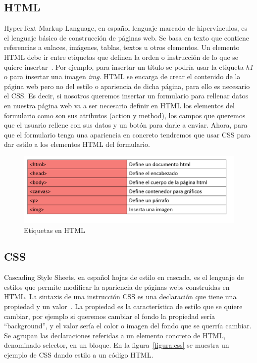 \documentclass[a4paper, 12pt]{book}
\begin{document}
\subsection{HTML}
HyperText Markup Language, en español lenguaje marcado de hipervínculos, es el lenguaje básico de construcción de páginas web. Se basa en texto que contiene referencias a enlaces, imágenes, tablas, textos u otros elementos. Un elemento HTML debe ir entre etiquetas que definen la orden o instrucción de lo que se quiere insertar~\cite{equipo2009diseno}. Por ejemplo, para insertar un título se podría usar la etiqueta \textit{h1} o para insertar una imagen \textit{img}. HTML se encarga de crear el contenido de la página web pero no del estilo o apariencia de dicha página, para ello es necesario el CSS. Es decir, si nosotros queremos insertar un formulario para rellenar datos en nuestra página web va a ser necesario definir en HTML los elementos del formulario como son sus atributos (action y method), los campos que queremos que el usuario rellene con sus datos y un botón para darle a enviar. Ahora, para que el formulario tenga una apariencia en concreto tendremos que usar CSS para dar estilo a los elementos HTML del formulario.

\begin{figure}[h]
        \centering
        \includegraphics[scale=0.6]{img/tags.PNG}
        \caption{Etiquetas en HTML}
        \label{figura:tags}
\end{figure}

\subsection{CSS}
Cascading Style Sheets, en español hojas de estilo en cascada, es el lenguaje de estilos que permite modificar la apariencia de páginas webs construidas en HTML. La sintaxis de una instrucción CSS es una declaración que tiene una propiedad y un valor~\cite{mdn}. La propiedad es la característica de estilo que se quiere cambiar, por ejemplo si queremos cambiar el fondo la propiedad sería ``background'', y el valor sería el color o imagen del fondo que se querría cambiar. Se agrupan las declaraciones referidas a un elemento concreto de HTML, denominado selector, en un bloque. En la figura~\ref{figura:css} se muestra un ejemplo de CSS dando estilo a un código HTML.
\end{document}
